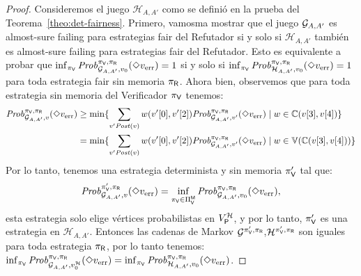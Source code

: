 \noindent
\begin{proof} 
Consideremos el juego $\mathcal{H}_{A,A'}$ como se definió en la prueba del Teorema~\ref{theo:det-fairness}.  Primero, vamosma mostrar que el juego $\StochG_{A,A'}$ es almost-sure failing para estrategias fair del Refutador si y solo si $\mathcal{H}_{A,A'}$ también es almost-sure failing para estrategias fair del Refutador.  
Esto es equivalente a probar que $\inf_{\strat{\Verifier}} \Prob{\strat{\Verifier}}{\strat{\Refuter}}_{\StochG_{A,A'}, \InitVertex}(\Diamond \ErrorSt)=1$ 
si y solo si $\inf_{\strat{\Verifier}} \Prob{\strat{\Verifier}}{\strat{\Refuter}}_{\mathcal{H}_{A,A'}, \InitVertex}(\Diamond \ErrorSt)=1$ para toda estrategia fair sin memoria  $\strat{\Refuter}$. Ahora bien, observemos que para toda estrategia sin memoria del Verificador $\strat{\Verifier}$ tenemos:
\begin{align*}
     \Prob{\strat{\Verifier}}{\strat{\Refuter}}_{\mathcal{G}_{A,A'}, v}(\Diamond \ErrorSt) & \geq \min\{ \sum_{v' \post(v)} w(\pr{0}{v'}, \pr{2}{v'})\Prob{\strat{\Verifier}}{\strat{\Refuter}}_{\mathcal{G}_{A,A'}, v'}(\Diamond \ErrorSt) \mid w \in \couplings{\pr{3}{v}}{\pr{4}{v}} \}\\
         & = \min\{ \sum_{v' \post(v)} w(\pr{0}{v'}, \pr{2}{v'})\Prob{\strat{\Verifier}}{\strat{\Refuter}}_{\mathcal{G}_{A,A'}, v'}(\Diamond \ErrorSt) \mid w \in\vertices{\couplings{\pr{3}{v}}{\pr{4}{v}}} \}
\end{align*}
Por lo tanto, tenemos una estrategia determinista y sin memoria $\strat{\Verifier}'$ tal que:
\[
\Prob{\strat{\Verifier}'}{\strat{\Refuter}}_{\mathcal{G}_{A,A'}, v}(\Diamond \ErrorSt) = \inf_{\strat{\Verifier} \in \Strategies{\Verifier}^{\Memoryless}} \Prob{\strat{\Verifier}}{\strat{\Refuter}}_{\StochG_{A,A'}, \InitVertex}(\Diamond \ErrorSt),
\]
esta estrategia solo elige vértices probabilistas en  $V^{\mathcal{H}}_{\Probabilistic}$, y por lo tanto, $\strat{\Verifier}'$ es una estrategia 
en $\mathcal{H}_{A,A'}$. Entonces las cadenas de Markov  $\StochG^{\strat{\Verifier}',\strat{\Refuter}}$,$ \mathcal{H}^{\strat{\Verifier}',\strat{\Refuter}}$
son iguales para toda estrategia $\strat{\Refuter}$, por lo tanto tenemos: 
$\inf_{\strat{\Verifier}} \Prob{\strat{\Verifier}}{\strat{\Refuter}}_{\StochG_{A,A'}, v^{\mathcal{H}}_0}(\Diamond \ErrorSt)
= \inf_{\strat{\Verifier}} \Prob{\strat{\Verifier}}{\strat{\Refuter}}_{\mathcal{H}_{A,A'}, \InitVertex}(\Diamond \ErrorSt)$.


\end{proof}
